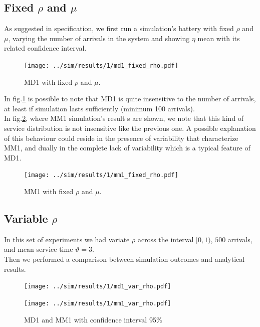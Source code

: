 \documentclass{llncs}
\newcommand{\labelsec}[1]{\label{sec:#1}}
\begin{document}
\subsection{Fixed $\rho$ and $\mu$}
\labelsec{MD1_MM1_fixed_rho}

As suggested in specification, we first run a simulation's battery with fixed $\rho$ and $\mu$, varying the number of arrivals in the system and showing $\eta$ mean with its related confidence interval.

\begin{figure}
\centering
\texttt{[image: ../sim/results/1/md1\_fixed\_rho.pdf]}
\caption{MD1 with fixed $\rho$ and $\mu$.}
\label{fig:md1_fixed}
\end{figure}

In fig.\ref{fig:md1_fixed} is possible to note that MD1 is quite insensitive to the number of arrivals, at least if simulation lasts sufficiently (minimum 100 arrivals).\\
In fig.\ref{fig:mm1_fixed}, where MM1 simulation's result s are shown, we note that this kind of service distribution is not insensitive like the previous one. A possible explanation of this behaviour could reside in the presence of variability that characterize MM1, and dually in the complete lack of variability which is a typical feature of MD1.
 
\begin{figure}
\centering
\texttt{[image: ../sim/results/1/mm1\_fixed\_rho.pdf]}
\caption{MM1 with fixed $\rho$ and $\mu$.}
\label{fig:mm1_fixed}
\end{figure}


\subsection{Variable $\rho$}
\labelsec{MD1_MM1_fixed_rho}

In this set of experiments we had variate $\rho$ across the interval $[0,1)$, $500$ arrivals, and mean service time $\vartheta=3$.\\
Then we performed a comparison between simulation outcomes and analytical results.\\

\begin{figure}
\begin{minipage}[b]{7cm}
\centering
\texttt{[image: ../sim/results/1/md1\_var\_rho.pdf]}
\end{minipage}\qquad
\begin{minipage}[b]{7cm}
\centering
\texttt{[image: ../sim/results/1/mm1\_var\_rho.pdf]}
\end{minipage}
\caption{MD1 and MM1 with confidence interval 95\%}
\label{fig:md1_mm1_varrho_confint}
\end{figure}
\end{document}
